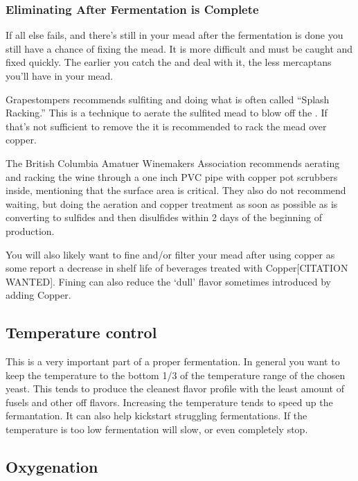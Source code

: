   \subsubsection{Eliminating After Fermentation is Complete}
   If all else fails, and there's still  in your mead after the fermentation is done you still have a 
   chance of fixing the mead. It is more difficult and must be caught and fixed quickly. The earlier you catch 
   the  and deal with it, the less mercaptans you'll have in your mead. 

   Grapestompers\cite{grapestompers-H2S}
   recommends sulfiting and doing what is often called  ``Splash Racking.'' This is a technique to aerate the 
   sulfited mead to blow off the . If that's not sufficient to remove the  it is recommended 
   to rack the mead over copper. 

   The British Columbia Amatuer Winemakers Association\cite{bcawa-H2S} recommends
   aerating and racking the wine through a one inch PVC pipe with copper pot scrubbers inside, mentioning that 
   the surface area is critical. They also do not recommend waiting, but doing the aeration and copper treatment 
   as soon as possible as  is converting to sulfides and then disulfides within 2 days of the 
   beginning of  production.

   You will also likely want to fine and/or filter your mead after using copper as some report a decrease in 
   shelf life of beverages treated with Copper[CITATION WANTED]. Fining can also reduce the `dull' flavor
   sometimes introduced by adding Copper.

 \subsection{Temperature control}
  This is a very important part of a proper fermentation. In general you want to keep the temperature to the 
  bottom 1/3 of the temperature range of the chosen yeast. This tends to produce the cleanest flavor profile with 
  the least amount of fusels and other off flavors. Increasing the temperature tends to speed up the fermantation.
  It can also help kickstart struggling fermentations. If the temperature is too low fermentation will slow, or 
  even completely stop.

 \subsection{Oxygenation}


